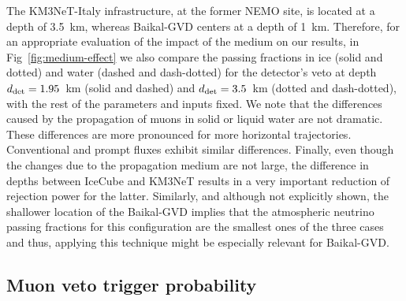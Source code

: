 \documentclass[aps,prd,showpacs,letterpaper,onecolumn,longbibliography,superscriptaddress,notitlepage,nofootinbib]{revtex4-1}%
\begin{document}
The KM3NeT-Italy infrastructure, at the former NEMO site, is located at a depth of 3.5~km, whereas Baikal-GVD centers at a depth of 1~km. Therefore, for an appropriate evaluation of the impact of the medium on our results, in Fig~\ref{fig:medium-effect} we also compare the passing fractions in ice (solid and dotted) and water (dashed and dash-dotted) for the detector's veto at depth $d_{\rm det} = 1.95$~km (solid and dashed) and $d_{\rm det} = 3.5$~km (dotted and dash-dotted), with the rest of the parameters and inputs fixed. We note that the differences caused by the propagation of muons in solid or liquid water are not dramatic. These differences are more pronounced for more horizontal trajectories. Conventional and prompt fluxes exhibit similar differences. Finally, even though the changes due to the propagation medium are not large, the difference in depths between IceCube and KM3NeT results in a very important reduction of rejection power for the latter. Similarly, and although not explicitly shown, the shallower location of the Baikal-GVD implies that the atmospheric neutrino passing fractions for this configuration are the smallest ones of the three cases and thus, applying this technique might be especially relevant for Baikal-GVD. 

\subsection{Muon veto trigger probability}
\label{sec:response}
\end{document}
